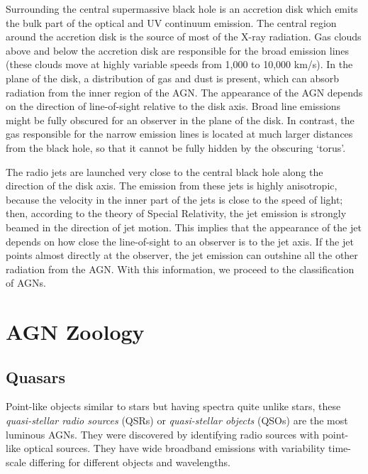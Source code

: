 \documentclass[a4paper,11pt]{report}
\newcommand{\ti}[1]{\textit{#1}}
\begin{document}
Surrounding the central supermassive black hole is an accretion disk which emits the bulk part of the optical and UV continuum emission. The central region around the accretion disk is the source of most of the X-ray radiation. Gas clouds above and below the accretion disk are responsible for the broad emission lines (these clouds move at highly variable speeds from 1,000 to 10,000 km/s). In the plane of the disk, a distribution of gas and dust is present, which can absorb radiation from the inner region of the AGN. The appearance of the AGN depends on the direction of line-of-sight relative to the disk axis. Broad line emissions might be fully obscured for an observer in the plane of the disk. In contrast, the gas responsible for the narrow emission lines is located at much larger distances from the black hole, so that it cannot be fully hidden by the obscuring `torus'.

\vspace{1em}

The radio jets are launched very close to the central black hole along the direction of the disk axis. The emission from these jets is highly anisotropic, because the velocity in the inner part of the jets is close to the speed of light; then, according to the theory of Special Relativity, the jet emission is strongly beamed in the direction of jet motion. This implies that the appearance of the jet depends on how close the line-of-sight to an observer is to the jet axis. If the jet points almost directly at the observer, the jet emission can outshine all the other radiation from the AGN. With this information, we proceed to the classification of AGNs.

\section{AGN Zoology}

\subsection{Quasars}
Point-like objects similar to stars but having spectra quite unlike stars, these \ti{quasi-stellar radio sources} (QSRs) or \ti{quasi-stellar objects} (QSOs) are the most luminous AGNs. They were discovered by identifying radio sources with point-like optical sources. They have wide broadband emissions with variability time-scale differing for different objects and wavelengths.

\vspace{1em}
\end{document}
